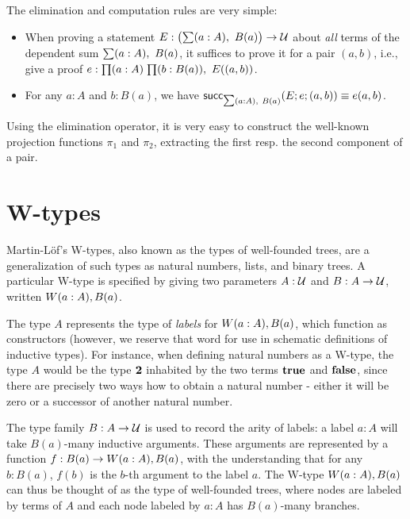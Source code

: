 The elimination and computation rules are very simple:

\begin{itemize}
\item When proving a statement $E : \big(\sm{a:A} B(a)\big) \to \type$ about \emph{all} terms of the dependent sum $\sm{a:A} B(a)$, it suffices to prove it for a pair $(a,b)$, i.e., give a proof $e : \prd{a:A}{b:B(a)} E((a,b))$.
\end{itemize}

\begin{itemize}
\item For any $a : A$ and $b : B(a)$, we have $\rec_{\sm{a:A} B(a)}(E;e;(a,b)) \equiv e(a,b)$.
\end{itemize}
Using the elimination operator, it is very easy to construct the well-known projection functions $\pi_1$ and $\pi_2$, extracting the first resp. the second component of a pair.


\section{W-types}
Martin-L{\"o}f's W-types, also known as the types of well-founded trees, are a generalization of such types as natural numbers, lists, and binary trees. A particular W-type is specified by giving two parameters $A : \mathcal{U}$ and $B : A \to \mathcal{U}$, written $W(a:A), B(a)$.

The type $A$ represents the type of \emph{labels} for $W(a :A), B(a)$, which function as constructors (however, we reserve that word for use in schematic definitions of inductive types). For instance, when defining natural numbers as a W-type, the type $A$ would be the type $\mathbf{2}$ inhabited by the two terms $\mathbf{true}$ and $\mathbf{false}$, since there are precisely two ways how to obtain a natural number - either it will be zero or a successor of another natural number. 

The type family $B : A \to \mathcal{U}$ is used to record the arity of labels: a label $a : A$ will take $B(a)$-many inductive arguments. These arguments are represented by a function $f : B(a) \to W(a :A), B(a)$, with the understanding that for any $b : B(a)$, $f(b)$ is the $b$-th argument to the label $a$. The W-type $W(a :A), B(a)$ can thus be thought of as the type of well-founded trees, where nodes are labeled by terms of $A$ and each node labeled by $a : A$ has $B(a)$-many branches.

